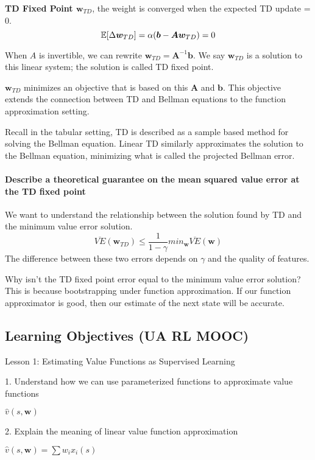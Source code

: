 \documentclass[sutton_barto_notes.tex]{subfiles}
\begin{document}
\begin{definition}
\textbf{TD Fixed Point $\bm{w}_{TD}$}, the weight is converged when the expected TD update = 0.
$$\operatorname*{\mathbb{E}}[\Delta \bm{w}_{TD}] = \alpha(\bm{b} - \bm{A}\bm{w}_{TD}) = 0$$
\end{definition}
When $A$ is invertible, we can rewrite $\bm{w}_{TD} = \bm{A}^{-1}\bm{b}$. We say $\bm{w}_{TD}$ is a solution to this linear system; the solution is called TD fixed point.

$\bm{w}_{TD}$ minimizes an objective that is based on this $\bm{A}$ and $\bm{b}$. This objective extends the connection between TD and Bellman equations to the function approximation setting.

Recall in the tabular setting, TD is described as a sample based method for solving the Bellman equation. Linear TD similarly approximates the solution to the Bellman equation, minimizing what is called the projected Bellman error.

\paragraph{Describe a theoretical guarantee on the mean squared value error at the TD fixed point}

We want to understand the relationship between the solution found by TD and the minimum value error solution.
$$\overline{VE}(\bm{w}_{TD}) \leq \frac{1}{1-\gamma}min_{\bm{w}}\overline{VE}(\bm{w})$$
The difference between these two errors depends on $\gamma$ and the quality of features.

Why isn't the TD fixed point error equal to the minimum value error solution? This is because bootstrapping under function approximation. If our function approximator is good, then our estimate of the next state will be accurate.


\subsection{Learning Objectives (UA RL MOOC)}

Lesson 1: Estimating Value Functions as Supervised Learning 

1. Understand how we can use parameterized functions to approximate value functions 

$\hat{v}(s, \bm{w})$

2. Explain the meaning of linear value function approximation 

$\hat{v}(s, \bm{w}) = \sum w_i x_i(s)$
\end{document}
